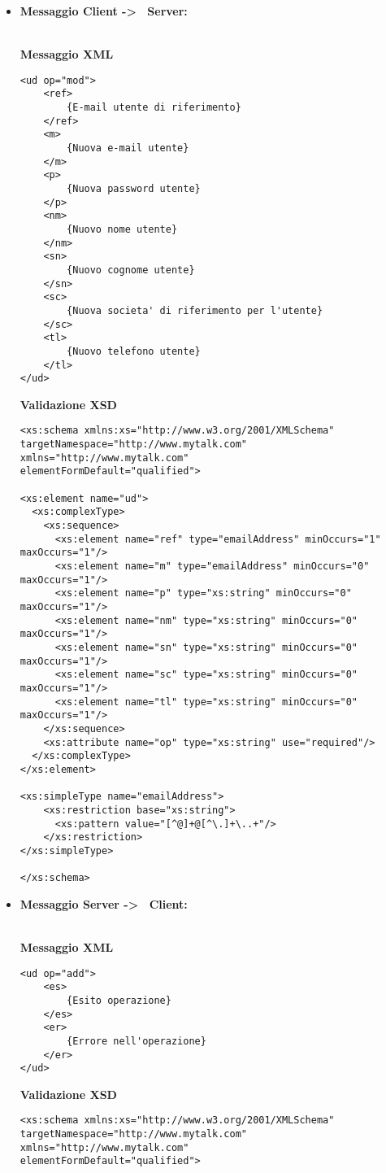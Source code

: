 {{\begin{itemize}
			\item[] \textbf{Messaggio Client -\textgreater~ Server:}{\\
			\textbf{Messaggio XML}\\
				\begin{lstlisting}
<ud op="mod">
	<ref>
		{E-mail utente di riferimento}
	</ref>
	<m>
		{Nuova e-mail utente}
	</m>
	<p>
		{Nuova password utente}
	</p>
	<nm>
		{Nuovo nome utente}
	</nm>
	<sn>
		{Nuovo cognome utente}
	</sn>
	<sc>
		{Nuova societa' di riferimento per l'utente}
	</sc>
	<tl>
		{Nuovo telefono utente}
	</tl>
</ud>
				\end{lstlisting}
				\textbf{Validazione XSD}\\
				\begin{lstlisting}
<xs:schema xmlns:xs="http://www.w3.org/2001/XMLSchema"
targetNamespace="http://www.mytalk.com"
xmlns="http://www.mytalk.com"
elementFormDefault="qualified">

<xs:element name="ud">
  <xs:complexType>
    <xs:sequence>
      <xs:element name="ref" type="emailAddress" minOccurs="1" maxOccurs="1"/>
      <xs:element name="m" type="emailAddress" minOccurs="0" maxOccurs="1"/>
      <xs:element name="p" type="xs:string" minOccurs="0" maxOccurs="1"/>
      <xs:element name="nm" type="xs:string" minOccurs="0" maxOccurs="1"/>
      <xs:element name="sn" type="xs:string" minOccurs="0" maxOccurs="1"/>
      <xs:element name="sc" type="xs:string" minOccurs="0" maxOccurs="1"/>
      <xs:element name="tl" type="xs:string" minOccurs="0" maxOccurs="1"/>
    </xs:sequence>
    <xs:attribute name="op" type="xs:string" use="required"/>
  </xs:complexType>
</xs:element>

<xs:simpleType name="emailAddress"> 
    <xs:restriction base="xs:string"> 
      <xs:pattern value="[^@]+@[^\.]+\..+"/> 
    </xs:restriction> 
</xs:simpleType> 

</xs:schema>
				\end{lstlisting}
				}
				
				\item[] \textbf{Messaggio Server -\textgreater~ Client:}{\\
				\textbf{Messaggio XML}\\
				\begin{lstlisting}
<ud op="add">
	<es>
		{Esito operazione}
	</es>
	<er>
		{Errore nell'operazione}
	</er>
</ud>
				\end{lstlisting}
				\textbf{Validazione XSD}\\
				\begin{lstlisting}
<xs:schema xmlns:xs="http://www.w3.org/2001/XMLSchema"
targetNamespace="http://www.mytalk.com"
xmlns="http://www.mytalk.com"
elementFormDefault="qualified">


\end{lstlisting}}
\end{itemize}}}
